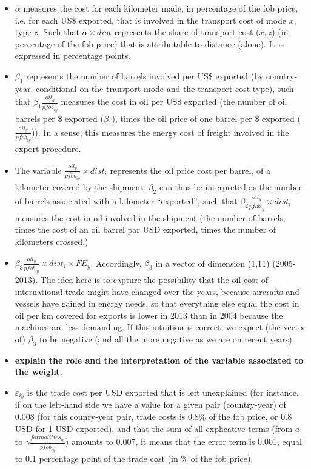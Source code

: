 \documentclass[a4paper,11pt]{article}
\begin{document}
\begin{itemize}
\item $\alpha$ measures the cost for each kilometer made, in percentage of the fob price, i.e. for each US\$ exported, that is involved in the transport cost of mode $x$, type $z$. Such that $\alpha \times dist$ represents the share of transport cost ($x,z$) (in percentage of the fob price) that is attributable to distance (alone). It is expressed in percentage points.
\item $\beta_1$ represents the number of barrels involved per US\$ exported (by country-year, conditional on the transport mode and the transport cost type), such that $\beta_1\frac{oil_{y}}{\bar{pfob}_{iy}}$ measures the cost in oil per US\$ exported (the number of oil barrels per \$ exported ($\beta_1$), times the oil price of one barrel per \$ exported ($\frac{oil_{y}}{\bar{pfob}_{iy}}$)). In a sense, this measures the energy cost of freight involved in the export procedure.
\item The variable $\frac{oil_{y}}{\bar{pfob}_{iy}}\times dist_{i}$ represents the oil price cost per barrel, of a kilometer covered by the shipment. $\beta_2$ can thus be interpreted as the number of barrels associated with a kilometer ``exported'', such that $\beta_2\frac{oil_{y}}{\bar{pfob}_{iy}}\times dist_{i}$ measures the cost in oil involved in the shipment (the number of barrels, times the cost of an oil barrel par USD exported, times the number of kilometers crossed.)

\item $\beta_3\frac{oil_{y}}{\bar{pfob}_{iy}}\times dist_{i}\times FE_y$. Accordingly, $\beta_3$ in a vector of dimension (1,11) (2005-2013). The idea here is to capture the possibility that the oil cost of international trade might have changed over the years, because aircrafts and vessels have gained in energy needs, so that everything else equal the cost in oil per km covered for exports is lower in 2013 than in 2004 because the machines are less demanding.  If this intuition is correct, we expect (the vector of) $\beta_3$ to be negative (and all the more negative as we are on recent years).
\item \textbf{explain the role and the interpretation of the variable associated to the weight.} 

\item $\varepsilon_{iy}$ is the trade cost per USD exported that is left unexplained (for instance, if on the left-hand side we have a value for a given pair (country-year) of 0.008 (for this counry-year pair, trade costs is 0.8\% of the fob price, or 0.8 USD for 1 USD exported), and that the sum of all explicative terms (from $a$ to $\gamma\frac{formalities_{iy}}{\bar{pfob}_{iy}}$) amounts to 0.007, it means that the error term is 0.001, equal to 0.1 percentage point of the trade cost (in \% of the fob price).

\end{itemize}
\end{document}
